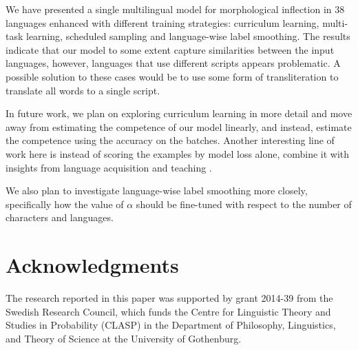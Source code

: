 \documentclass[11pt,a4paper]{article}
\begin{document}
We have presented a single multilingual model for morphological
inflection in $38$ languages enhanced with different training
strategies: curriculum learning, multi-task learning, scheduled
sampling and language-wise label smoothing.  The results indicate that
our model to some extent capture similarities between the input
languages, however, languages that use different scripts appears
problematic. A possible solution to these cases would be to use some
form of transliteration to translate all words to a single script.

In future work, we plan on exploring curriculum learning in more detail
and move away from estimating the competence of our model linearly,
and instead, estimate the competence using the accuracy on the
batches. Another interesting line of work here is instead of scoring
the examples by model loss alone, combine it with insights from
language acquisition and teaching \cite{ionin2002easier,
slabakova2010easy}.

We also plan to investigate language-wise label smoothing more
closely, specifically how the value of $\alpha$ should be fine-tuned
with respect to the number of characters and languages.

\section*{Acknowledgments}

The research reported in this paper was supported by grant 2014-39
from the Swedish Research Council, which funds the Centre for
Linguistic Theory and Studies in Probability (CLASP) in the Department
of Philosophy, Linguistics, and Theory of Science at the University
of Gothenburg.

 



\end{document}
